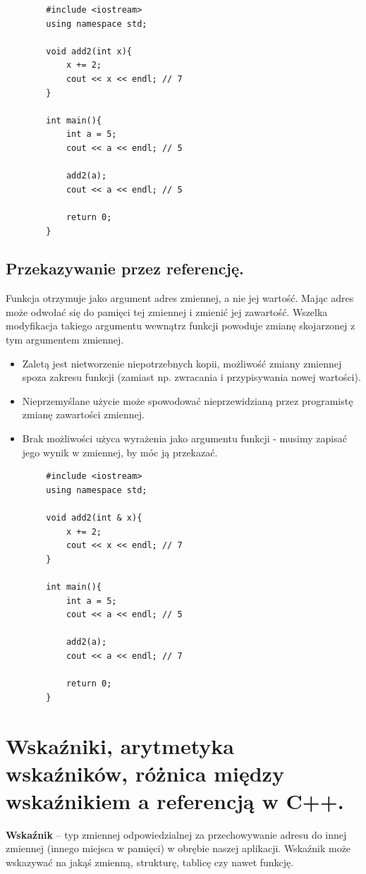 \documentclass[12pt]{article}
\begin{document}
    \begin{verbatim}
        #include <iostream>
        using namespace std;

        void add2(int x){
            x += 2;
            cout << x << endl; // 7
        }

        int main(){
            int a = 5;
            cout << a << endl; // 5

            add2(a);
            cout << a << endl; // 5

            return 0;
        }
    \end{verbatim}

    \subsection{Przekazywanie przez referencję.}
    Funkcja otrzymuje jako argument adres zmiennej, a nie jej wartość. Mając adres może odwołać się do pamięci tej
    zmiennej i zmienić jej zawartość. Wszelka modyfikacja takiego argumentu wewnątrz funkcji powoduje zmianę skojarzonej
    z tym argumentem zmiennej.
    \begin{itemize}
        \item Zaletą jest nietworzenie niepotrzebnych kopii, możliwość zmiany zmiennej spoza zakresu funkcji (zamiast
        np. zwracania i przypisywania nowej wartości).
        \item Nieprzemyślane użycie może spowodować nieprzewidzianą przez programistę zmianę zawartości zmiennej.
        \item Brak możliwości użyca wyrażenia jako argumentu funkcji - musimy zapisać jego wynik w zmiennej, by móc
        ją przekazać.
    \end{itemize}

    \begin{verbatim}
        #include <iostream>
        using namespace std;

        void add2(int & x){
            x += 2;
            cout << x << endl; // 7
        }

        int main(){
            int a = 5;
            cout << a << endl; // 5

            add2(a);
            cout << a << endl; // 7

            return 0;
        }
    \end{verbatim}

    \newpage

    \section{Wskaźniki, arytmetyka wskaźników, różnica między wskaźnikiem a referencją w C++.}
    \begin{definition}
    	\textbf{Wskaźnik} – typ zmiennej odpowiedzialnej za przechowywanie adresu do innej zmiennej (innego miejsca w pamięci) w obrębie naszej aplikacji.
    	Wskaźnik może wskazywać na jakąś zmienną, strukturę, tablicę czy nawet funkcję.
    \end{definition}
    
\end{document}
